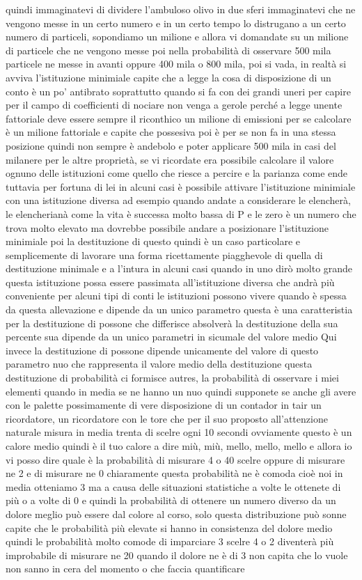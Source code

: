 quindi immaginatevi di dividere l'ambuloso olivo in due sferi immaginatevi che ne vengono messe in un certo numero e in un certo tempo lo distrugano a un certo numero di particeli, sopondiamo un milione e allora vi domandate su un milione di particele che ne vengono messe poi nella probabilità di osservare 500 mila particele ne messe in avanti oppure 400 mila o 800 mila, poi si vada, in realtà si avviva l'istituzione minimiale capite che a legge la cosa di disposizione di un conto è un po' antibrato soprattutto quando si fa con dei grandi uneri per capire per il campo di coefficienti di nociare non venga a gerole perché a legge unente fattoriale deve essere sempre il riconthico un milione di emissioni per se calcolare è un milione fattoriale e capite che possesiva poi è per se non fa in una stessa posizione quindi non sempre è andebolo e poter applicare 500 mila in casi del milanere per le altre proprietà, se vi ricordate era possibile calcolare il valore ognuno delle istituzioni come quello che riesce a percire e la parianza come ende tuttavia per fortuna di lei in alcuni casi è possibile attivare l'istituzione minimiale con una istituzione diversa ad esempio quando andate a considerare le elencherà, le elencherianà come la vita è successa molto bassa di P e le zero è un numero che trova molto elevato ma dovrebbe possibile andare a posizionare l'istituzione minimiale poi la destituzione di questo quindi è un caso particolare e semplicemente di lavorare una forma ricettamente piagghevole di quella di destituzione minimale e a l'intura in alcuni casi quando in uno dirò molto grande questa istituzione possa essere passimata all'istituzione diversa che andrà più conveniente per alcuni tipi di conti le istituzioni possono vivere quando è spessa da questa allevazione e dipende da un unico parametro questa è una caratteristia per la destituzione di possone che differisce absolverà la destituzione della sua percente sua dipende da un unico parametri in sicumale del valore medio Qui invece la destituzione di possone dipende unicamente del valore di questo parametro nuo che rappresenta il valore medio della destituzione questa destituzione di probabilità ci formisce autres, la probabilità di osservare i miei elementi quando in media se ne hanno un nuo quindi supponete se anche gli avere con le palette possimamente di vere disposizione di un contador in tair un ricordatore, un ricordatore con le tore che per il suo proposto all'attenzione naturale misura in media trenta di scelre ogni 10 secondi ovviamente questo è un calore medio quindi è il tuo calore a dire miù, miù, mello, mello, mello e allora io vi posso dire quale è la probabilità di misurare 4 o 40 scelre oppure di misurare ne 2 e di misurare ne 0 chiaramente questa probabilità ne è comoda cioè noi in media otteniamo 3 ma a causa delle situazioni statistiche a volte le ottenete di più o a volte di 0 e quindi la probabilità di ottenere un numero diverso da un dolore meglio può essere dal colore al corso, solo questa distribuzione può sonne capite che le probabilità più elevate si hanno in consistenza del dolore medio quindi le probabilità molto comode di imparciare 3 scelre 4 o 2 diventerà più improbabile di misurare ne 20 quando il dolore ne è di 3 non capita che lo vuole non sanno in cera del momento o che faccia quantificare 
